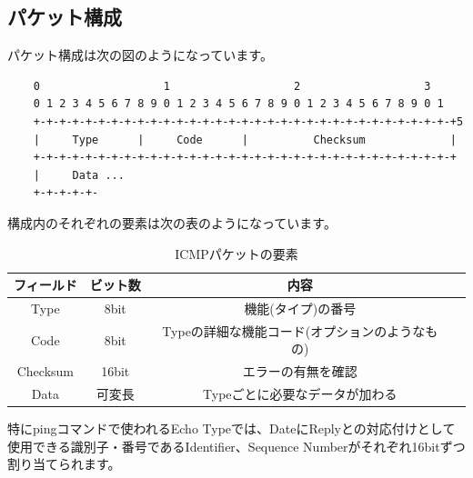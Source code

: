 \subsection{パケット構成}
パケット構成は次の図のようになっています。\\
\begin{shaded}
    \begin{verbatim}
    0                   1                   2                   3
    0 1 2 3 4 5 6 7 8 9 0 1 2 3 4 5 6 7 8 9 0 1 2 3 4 5 6 7 8 9 0 1
    +-+-+-+-+-+-+-+-+-+-+-+-+-+-+-+-+-+-+-+-+-+-+-+-+-+-+-+-+-+-+-+-+5
    |     Type      |     Code      |          Checksum             |
    +-+-+-+-+-+-+-+-+-+-+-+-+-+-+-+-+-+-+-+-+-+-+-+-+-+-+-+-+-+-+-+-+
    |     Data ...
    +-+-+-+-+-
  \end{verbatim}
\end{shaded}
構成内のそれぞれの要素は次の表のようになっています。
\begin{table}[bth]
    \begin{center}
    \caption{ICMPパケットの要素}
        \label{icmp-table}
            \begin{tabular}{|c|c|c|c|} \hline
                フィールド & ビット数 & 内容 \\ \hline
                Type & 8bit & 機能(タイプ)の番号 \\ \hline
                Code & 8bit & Typeの詳細な機能コード(オプションのようなもの) \\ \hline
                Checksum & 16bit & エラーの有無を確認 \\ \hline
                Data & 可変長 & Typeごとに必要なデータが加わる\\ \hline
            \end{tabular}
    \end{center}
\end{table}
特にpingコマンドで使われるEcho Typeでは、DateにReplyとの対応付けとして使用できる識別子・番号であるIdentifier、Sequence Numberがそれぞれ16bitずつ割り当てられます。

